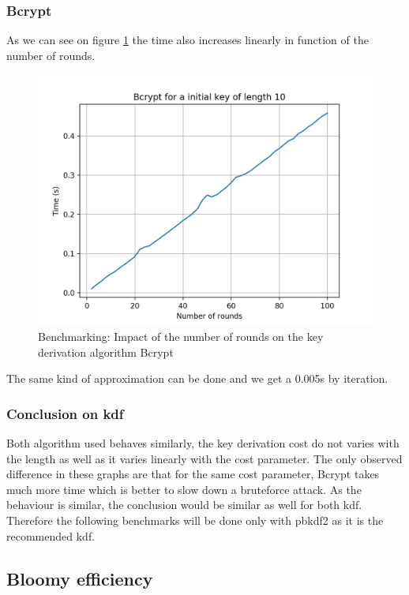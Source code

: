 \documentclass{eplmastersthesis}
\begin{document}
\subsubsection{Bcrypt}
As we can see on figure \ref{benchmarking:TimeBcrypt} the time also increases linearly in function of the number of rounds.
\begin{figure}[h!]
\begin{center}
	\includegraphics[scale=0.6]{res/TimeBcrypt}
	\caption{Benchmarking: Impact of the number of rounds on the key derivation algorithm Bcrypt}
	\label{benchmarking:TimeBcrypt}
\end{center}
\end{figure}
The same kind of approximation can be done and we get a 0.005s by iteration.
\subsubsection*{Conclusion on \gls{kdf}}
Both algorithm used behaves similarly, the key derivation cost do not varies with the length as well as it varies linearly with the cost parameter.
The only observed difference in these graphs are that for the same cost parameter, Bcrypt takes much more time which is better to slow down a bruteforce attack.
As the behaviour is similar, the conclusion would be similar as well for both \gls{kdf}. Therefore the following benchmarks will be done only with \gls{pbkdf2} as it is the recommended \gls{kdf}.

\subsection{Bloomy efficiency}
\label{sec:BloomyEfficiency}
\end{document}
